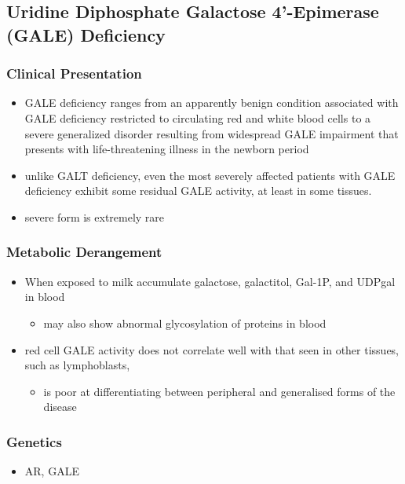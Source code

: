 \documentclass{scrartcl}
\begin{document}
\subsection{Uridine Diphosphate Galactose 4’-Epimerase (GALE) Deficiency}
\label{sec:org29e6ff2}
\subsubsection{Clinical Presentation}
\label{sec:org7cd3aef}
\begin{itemize}
\item GALE deficiency ranges from an apparently benign condition
associated with GALE deficiency restricted to circulating red and
white blood cells to a severe generalized disorder resulting from
widespread GALE impairment that presents with life-threatening
illness in the newborn period
\item unlike GALT deficiency, even the most severely affected patients
with GALE deficiency exhibit some residual GALE activity, at least
in some tissues.
\item severe form is extremely rare
\end{itemize}

\subsubsection{Metabolic Derangement}
\label{sec:orgccea3b5}
\begin{itemize}
\item When exposed to milk accumulate galactose, galactitol, Gal-1P, and
UDPgal in blood
\begin{itemize}
\item may also show abnormal glycosylation of proteins in blood
\end{itemize}
\item red cell GALE activity does not correlate well with that seen in
other tissues, such as lymphoblasts,
\begin{itemize}
\item is poor at differentiating between peripheral and generalised forms of the disease
\end{itemize}
\end{itemize}

\subsubsection{Genetics}
\label{sec:org3351f8d}
\begin{itemize}
\item AR, GALE
\end{itemize}
\end{document}
